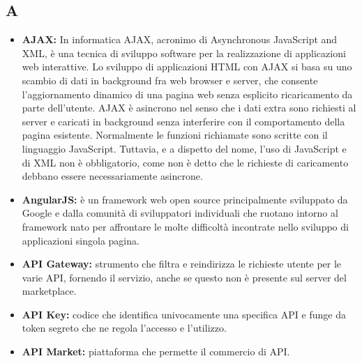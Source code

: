 \subsection{A}
\begin{itemize}
	\item \textbf{AJAX: }In informatica AJAX, acronimo di Asynchronous JavaScript and XML, è una tecnica di sviluppo software per la realizzazione di applicazioni web interattive. Lo sviluppo di applicazioni HTML con AJAX si basa su uno scambio di dati in background fra web browser e server, che consente l'aggiornamento dinamico di una pagina web senza esplicito ricaricamento da parte dell'utente.
	AJAX è asincrono nel senso che i dati extra sono richiesti al server e caricati in background senza interferire con il comportamento della pagina esistente. Normalmente le funzioni richiamate sono scritte con il linguaggio JavaScript. Tuttavia, e a dispetto del nome, l'uso di JavaScript e di XML non è obbligatorio, come non è detto che le richieste di caricamento debbano essere necessariamente asincrone.
	\item \textbf{AngularJS:} è un framework web open source principalmente sviluppato da Google e dalla comunità di sviluppatori individuali che ruotano intorno al framework nato per affrontare le molte difficoltà incontrate nello sviluppo di applicazioni singola pagina.
	\item \textbf{API Gateway:} strumento che filtra e reindirizza le richieste utente per le varie API, fornendo il servizio, anche se questo non è presente sul server del marketplace.
	\item \textbf{API Key:} codice che identifica univocamente una specifica API e funge da token segreto che ne regola l'accesso e l'utilizzo.
	\item \textbf{API Market:} piattaforma che permette il commercio di API.
\end{itemize}